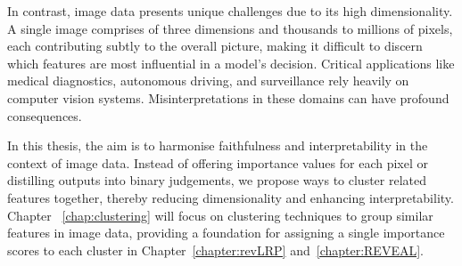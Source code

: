 In contrast, image data presents unique challenges due to its high dimensionality. A single image comprises of three dimensions and thousands to millions of pixels, each contributing subtly to the overall picture, making it difficult to discern which features are most influential in a model's decision. Critical applications like medical diagnostics, autonomous driving, and surveillance rely heavily on computer vision systems. Misinterpretations in these domains can have profound consequences.

In this thesis, the aim is to harmonise faithfulness and interpretability in the context of image data. Instead of offering importance values for each pixel or distilling outputs into binary judgements, we propose ways to cluster related features together, thereby reducing dimensionality and enhancing interpretability. Chapter ~\ref{chap:clustering} will focus on clustering techniques to group similar features in image data, providing a foundation for assigning a single importance scores to each cluster in Chapter~\ref{chapter:revLRP} and~\ref{chapter:REVEAL}.


